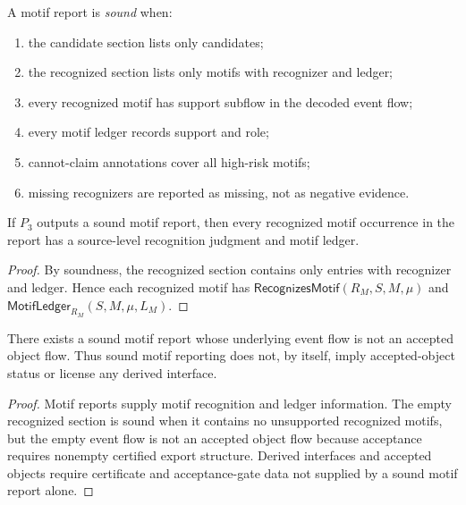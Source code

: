 \begin{definition}
\label{def:motif-report-sound}
A motif report is \emph{sound} when:
\begin{enumerate}
\item the candidate section lists only candidates;
\item the recognized section lists only motifs with recognizer and ledger;
\item every recognized motif has support subflow in the decoded event flow;
\item every motif ledger records support and role;
\item cannot-claim annotations cover all high-risk motifs;
\item missing recognizers are reported as missing, not as negative evidence.
\end{enumerate}
\end{definition}

\begin{theorem}
\label{thm:motif-report-sound-report}
If $P_3$ outputs a sound motif report, then every recognized motif occurrence in the report has a source-level recognition judgment and motif ledger.
\end{theorem}

\begin{proof}
By soundness, the recognized section contains only entries with recognizer and ledger. Hence each recognized motif has $\mathsf{RecognizesMotif}(R_M,S,M,\mu)$ and $\mathsf{MotifLedger}_{R_M}(S,M,\mu,L_M)$.
\end{proof}

\begin{theorem}
\label{thm:motif-report-does-not-license-objects}
There exists a sound motif report whose underlying event flow is not an accepted object flow. Thus sound motif reporting does not, by itself, imply accepted-object status or license any derived interface.
\end{theorem}

\begin{proof}
Motif reports supply motif recognition and ledger information. The empty recognized section is sound when it contains no unsupported recognized motifs, but the empty event flow is not an accepted object flow because acceptance requires nonempty certified export structure. Derived interfaces and accepted objects require certificate and acceptance-gate data not supplied by a sound motif report alone.
\end{proof}

